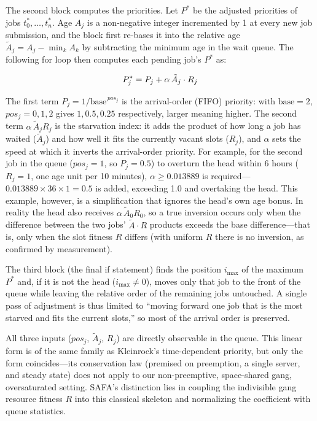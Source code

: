 \documentclass{ieeetj}
\begin{document}
The second block computes the priorities. Let $P^*$ be the adjusted priorities of jobs $t_0^*,\dots,t_n^*$. Age $A_j$ is a non-negative integer incremented by 1 at every new job submission, and the block first re-bases it into the relative age $\tilde A_j=A_j-\min_k A_k$ by subtracting the minimum age in the wait queue. The following for loop then computes each pending job's $P^*$ as:

\begin{equation}
P^*_j = P_j + \alpha\, \tilde A_j \cdot R_j
\label{eq:01}
\vspace{2pt}
\end{equation}

The first term $P_j=1/\text{base}^{\,pos_j}$ is the arrival-order (FIFO) priority: with $\text{base}=2$, $pos_j=0,1,2$ gives $1,0.5,0.25$ respectively, larger meaning higher. The second term $\alpha\,\tilde A_j R_j$ is the starvation index: it adds the product of how long a job has waited ($\tilde A_j$) and how well it fits the currently vacant slots ($R_j$), and $\alpha$ sets the speed at which it inverts the arrival-order priority. For example, for the second job in the queue ($pos_j=1$, so $P_j=0.5$) to overturn the head within 6 hours ($R_j=1$, one age unit per 10 minutes), $\alpha\ge0.013889$ is required---$0.013889\times36\times1=0.5$ is added, exceeding 1.0 and overtaking the head. This example, however, is a simplification that ignores the head's own age bonus. In reality the head also receives $\alpha\,\tilde A_0 R_0$, so a true inversion occurs only when the difference between the two jobs' $\tilde A\cdot R$ products exceeds the base difference---that is, only when the slot fitness $R$ differs (with uniform $R$ there is no inversion, as confirmed by measurement).

The third block (the final if statement) finds the position $i_{\max}$ of the maximum $P^*$ and, if it is not the head ($i_{\max}\neq0$), moves only that job to the front of the queue while leaving the relative order of the remaining jobs untouched. A single pass of adjustment is thus limited to ``moving forward one job that is the most starved and fits the current slots,'' so most of the arrival order is preserved.

All three inputs ($pos_j$, $\tilde A_j$, $R_j$) are directly observable in the queue. This linear form is of the same family as Kleinrock's time-dependent priority\cite{kleinrock1976queueing}, but only the form coincides---its conservation law (premised on preemption, a single server, and steady state) does not apply to our non-preemptive, space-shared gang, oversaturated setting. SAFA's distinction lies in coupling the indivisible gang resource fitness $R$ into this classical skeleton and normalizing the coefficient with queue statistics.
\end{document}

